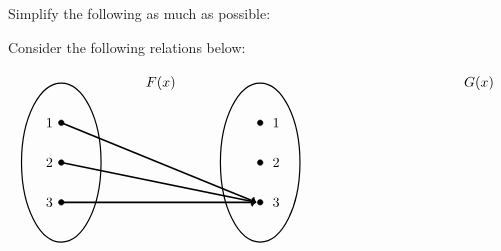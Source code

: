\documentclass[12pt,letterpaper]{exam}
\begin{document}
\begin{questions}



\newpage



\question[6] Simplify the following as much as possible: \pspace
{}



\newpage



\question[6] Consider the following relations below:

	\[
	\begin{tikzpicture}
	\node at (2.5,2) {$F(x)$};
	\draw[line width=0.03cm] (0,0) circle (1 and 2);
	\draw[line width=0.03cm] (5,0) circle (1 and 2);
	
	\draw[fill=black] (0,1) circle (0.07);
	\draw[fill=black] (0,0) circle (0.07);
	\draw[fill=black] (0,-1) circle (0.07);
	
	\draw[fill=black] (5,1) circle (0.07);
	\draw[fill=black] (5,0) circle (0.07);
	\draw[fill=black] (5,-1) circle (0.07);
	
	\draw[line width=0.04cm,->] (0,1) -- (4.9,-1);
	\draw[line width=0.04cm,->] (0,0) -- (4.9,-1);
	\draw[line width=0.04cm,->] (0,-1) -- (4.9,-1);
	
	\node at (-0.3,1) {$1$};
	\node at (-0.3,0) {$2$};
	\node at (-0.3,-1) {$3$};
	
	\node at (5.4,1) {$1$};
	\node at (5.4,0) {$2$};
	\node at (5.4,-1) {$3$};
	
	\tikzset{shift={(8,0)}}
	\node at (2.5,2) {$G(x)$};
	

\end{tikzpicture}\]
\end{questions}
\end{document}
